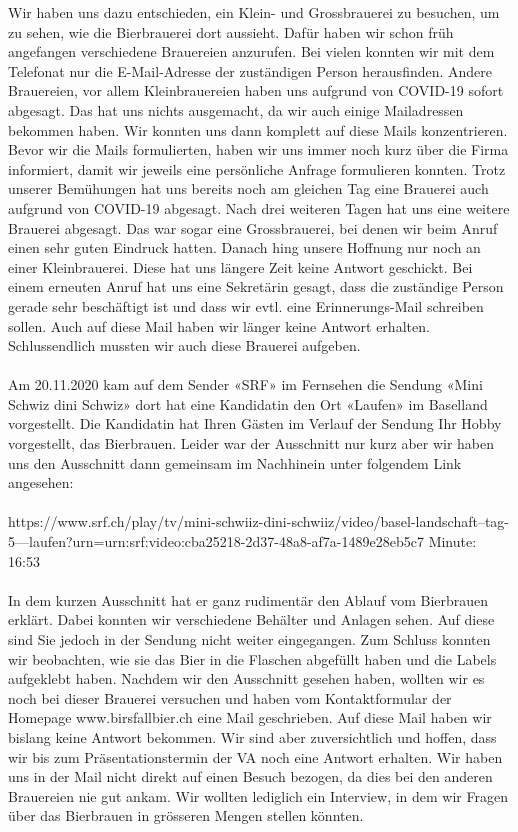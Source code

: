 Wir haben uns dazu entschieden, ein Klein- und Grossbrauerei zu besuchen, um zu sehen, wie die Bierbrauerei dort aussieht. Dafür haben wir schon früh angefangen verschiedene Brauereien anzurufen. Bei vielen konnten wir mit dem Telefonat nur die E-Mail-Adresse der zuständigen Person herausfinden. Andere Brauereien, vor allem Kleinbrauereien haben uns aufgrund von COVID-19 sofort abgesagt. Das hat uns nichts ausgemacht, da wir auch einige Mailadressen bekommen haben. Wir konnten uns dann komplett auf diese Mails konzentrieren. Bevor wir die Mails formulierten, haben wir uns immer noch kurz über die Firma informiert, damit wir jeweils eine persönliche Anfrage formulieren konnten. Trotz unserer Bemühungen hat uns bereits noch am gleichen Tag eine Brauerei auch aufgrund von COVID-19 abgesagt. Nach drei weiteren Tagen hat uns eine weitere Brauerei abgesagt. Das war sogar eine Grossbrauerei, bei denen wir beim Anruf einen sehr guten Eindruck hatten. Danach hing unsere Hoffnung nur noch an einer Kleinbrauerei. Diese hat uns längere Zeit keine Antwort geschickt. Bei einem erneuten Anruf hat uns eine Sekretärin gesagt, dass die zuständige Person gerade sehr beschäftigt ist und dass wir evtl. eine Erinnerungs-Mail schreiben sollen. Auch auf diese Mail haben wir länger keine Antwort erhalten. Schlussendlich mussten wir auch diese Brauerei aufgeben. \\\\
Am 20.11.2020 kam auf dem Sender «SRF»  im Fernsehen die Sendung «Mini Schwiz dini Schwiz» dort hat eine Kandidatin den Ort «Laufen» im Baselland vorgestellt. Die Kandidatin hat Ihren Gästen im Verlauf der Sendung Ihr Hobby vorgestellt, das Bierbrauen. Leider war der Ausschnitt nur kurz aber wir haben uns den Ausschnitt dann gemeinsam im Nachhinein unter folgendem Link angesehen: \\\\
https://www.srf.ch/play/tv/mini-schwiiz-dini-schwiiz/video/basel-landschaft--tag-5---laufen?urn=urn:srf:video:cba25218-2d37-48a8-af7a-1489e28eb5c7
Minute: 16:53\\\\
In dem kurzen Ausschnitt hat er ganz rudimentär den Ablauf vom Bierbrauen erklärt. Dabei konnten wir verschiedene Behälter und Anlagen sehen. Auf diese sind Sie jedoch in der Sendung nicht weiter eingegangen. Zum Schluss konnten wir beobachten, wie sie das Bier in die Flaschen abgefüllt haben und die Labels aufgeklebt haben.
Nachdem wir den Ausschnitt gesehen haben, wollten wir es noch bei dieser Brauerei versuchen und haben vom Kontaktformular der Homepage www.birsfallbier.ch eine Mail geschrieben. Auf diese Mail haben wir bislang keine Antwort bekommen. Wir sind aber zuversichtlich und hoffen, dass wir bis zum Präsentationstermin der VA noch eine Antwort erhalten. Wir haben uns in der Mail nicht direkt auf einen Besuch bezogen, da dies bei den anderen Brauereien nie gut ankam. Wir wollten lediglich ein Interview, in dem wir Fragen über das Bierbrauen in grösseren Mengen stellen könnten.

\newpage
